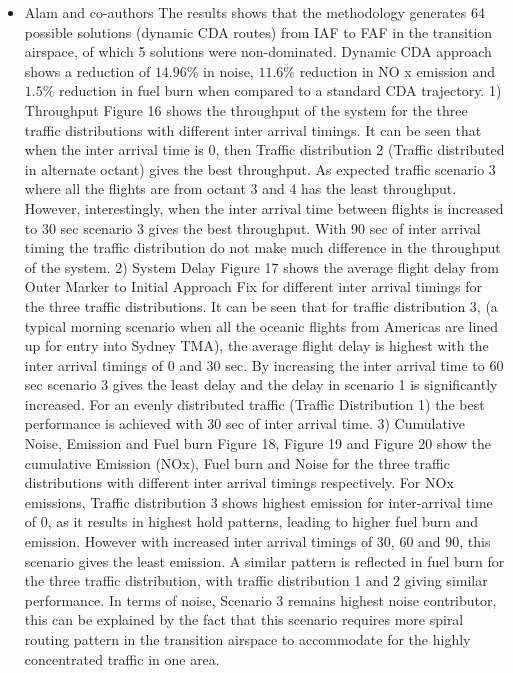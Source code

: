 \documentclass{aer1315-pretty}
\begin{document}
\begin{itemize}
\item Alam and co-authors \cite{Alam:2010} 
 The results shows that the methodology generates 64 possible solutions (dynamic CDA routes) from IAF to FAF in the transition airspace, of which 5 solutions were non-dominated. Dynamic CDA approach shows a reduction of $14.96\%$ in noise, $11.6\%$ reduction in NO x emission and $1.5\%$ reduction in fuel burn when compared to a standard CDA trajectory.
1) Throughput
      Figure 16 shows the throughput of the system for
the three traffic distributions with different inter
arrival timings. It can be seen that when the inter
arrival time is 0, then Traffic distribution 2 (Traffic
distributed in alternate octant) gives the best
throughput. As expected traffic scenario 3 where all
the flights are from octant 3 and 4 has the least
throughput.
      However, interestingly, when the inter arrival
time between flights is increased to 30 sec scenario 3
gives the best throughput. With 90 sec of inter arrival
timing the traffic distribution do not make much
difference in the throughput of the system.
2) System Delay
       Figure 17 shows the average flight delay from
Outer Marker to Initial Approach Fix for different
inter arrival timings for the three traffic distributions.
       It can be seen that for traffic distribution 3, (a
typical morning scenario when all the oceanic flights
from Americas are lined up for entry into Sydney
TMA), the average flight delay is highest with the
inter arrival timings of 0 and 30 sec. By increasing the
inter arrival time to 60 sec scenario 3 gives the least
delay and the delay in scenario 1 is significantly
increased. For an evenly distributed traffic (Traffic
Distribution 1) the best performance is achieved with
30 sec of inter arrival time.
3) Cumulative Noise, Emission and Fuel burn
       Figure 18, Figure 19 and Figure 20 show the
cumulative Emission (NOx), Fuel burn and Noise for
the three traffic distributions with different inter
arrival timings respectively. For NOx emissions,
Traffic distribution 3 shows highest emission for
inter-arrival time of 0, as it results in highest hold
patterns, leading to higher fuel burn and emission.
However with increased inter arrival timings of 30, 60
and 90, this scenario gives the least emission. A
similar pattern is reflected in fuel burn for the three
traffic distribution, with traffic distribution 1 and 2
giving similar performance. In terms of noise,
Scenario 3 remains highest noise contributor, this can
be explained by the fact that this scenario requires
more spiral routing pattern in the transition airspace to
accommodate for the highly concentrated traffic in
one area.


\end{itemize}
\end{document}

